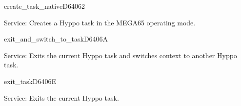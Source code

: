 \begin{hyppotrap}{create\_task\_native}{D640}{62}
\item [Service:]
  Creates a Hyppo task in the MEGA65 operating mode.
\notimplemented
\end{hyppotrap}


\begin{hyppotrap}{exit\_and\_switch\_to\_task}{D640}{6A}
\item [Service:]
  Exits the current Hyppo task and switches context to another Hyppo task.
\notimplemented
\end{hyppotrap}


\begin{hyppotrap}{exit\_task}{D640}{6E}
\item [Service:]
  Exits the current Hyppo task. %
\notimplemented
\end{hyppotrap}


